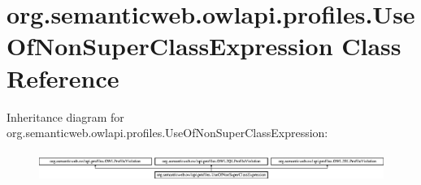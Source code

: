 \hypertarget{classorg_1_1semanticweb_1_1owlapi_1_1profiles_1_1_use_of_non_super_class_expression}{\section{org.\-semanticweb.\-owlapi.\-profiles.\-Use\-Of\-Non\-Super\-Class\-Expression Class Reference}
\label{classorg_1_1semanticweb_1_1owlapi_1_1profiles_1_1_use_of_non_super_class_expression}
}
Inheritance diagram for org.\-semanticweb.\-owlapi.\-profiles.\-Use\-Of\-Non\-Super\-Class\-Expression\-:\begin{figure}[H]
\begin{center}
\leavevmode
\includegraphics[height=0.957265cm]{classorg_1_1semanticweb_1_1owlapi_1_1profiles_1_1_use_of_non_super_class_expression}
\end{center}
\end{figure}

